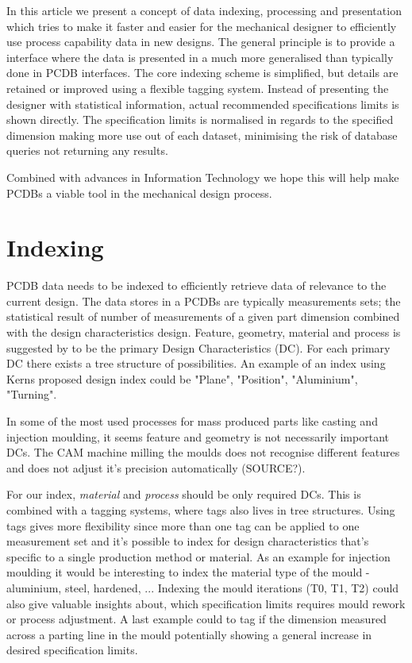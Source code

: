 \documentclass[aip,amsmath, reprint, author-year]{revtex4-1}
\begin{document}
In this article we present a concept of data indexing, processing and presentation which tries to make it faster and easier for the mechanical designer to efficiently use process capability data in new designs. 
The general principle is to provide a interface where the data is presented in a much more generalised than typically done in PCDB interfaces. 
The core indexing scheme is simplified, but details are retained or improved using a flexible tagging system. 
Instead of presenting the designer with statistical information, actual recommended specifications limits is shown directly. 
The specification limits is normalised in regards to the specified dimension making more use out of each dataset, minimising the risk of database queries not returning any results. 

Combined with advances in Information Technology we hope this will help make PCDBs a viable tool in the mechanical design process. 

\section{Indexing}
PCDB data needs to be indexed to efficiently retrieve data of relevance to the current design. The data stores in a PCDBs are typically measurements sets; the statistical result of number of measurements of a given part dimension combined with the design characteristics design. Feature, geometry, material and process is suggested by \cite{kern2003forecasting} to be the primary Design Characteristics (DC). For each primary DC there exists a tree structure of possibilities. An example of an index using Kerns proposed design index could be "Plane", "Position", "Aluminium", "Turning". 

In some of the most used processes for mass produced parts like casting and injection moulding, it seems feature and geometry is not necessarily important DCs. The CAM machine milling the moulds does not recognise different features and does not adjust it's precision automatically (SOURCE?).

For our index,  \emph{material} and \emph{process} should be only required DCs. This is combined with a tagging systems, where tags also lives in tree structures. Using tags gives more flexibility since more than one tag can be applied to one measurement set and it's possible to index for design characteristics that's specific to a single production method or material. As an example for injection moulding it would be interesting to index the material type of the mould - aluminium, steel, hardened, ... Indexing the mould iterations (T0, T1, T2) could also give valuable insights about, which specification limits requires mould rework or process adjustment. A last example could to tag if the dimension measured across a parting line in the mould potentially showing a general increase in desired specification limits.
\end{document}
